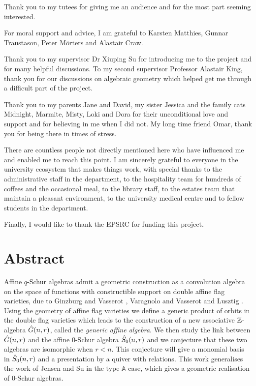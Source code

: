 \documentclass[a4paper, 11pt, twoside]{report}
\begin{document}
Thank you to my tutees for giving me an audience and for the most part seeming interested.

For moral support and advice, I am grateful to Karsten Matthies, Gunnar Traustason, Peter Mörters and Alastair Craw.

Thank you to my supervisor Dr Xiuping Su for introducing me to the project and for many helpful discussions. To my second supervisor Professor Alastair King, thank you for our discussions on algebraic geometry which helped get me through a difficult part of the project.  

Thank you to my parents Jane and David, my sister Jessica and the family cats Midnight, Marmite, Misty, Loki and Dora for their unconditional love and support and for believing in me when I did not. My long time friend Omar, thank you for being there in times of stress.

There are countless people not directly mentioned here who have influenced me and enabled me to reach this point. I am sincerely grateful to everyone in the university ecosystem that makes things work, with special thanks to the administrative staff in the department, to the hospitality team for hundreds of coffees and the occasional meal, to the library staff, to the estates team that maintain a pleasant environment, to the university medical centre and to fellow students in the department.

Finally, I would like to thank the EPSRC for funding this project.
\afterpage{\blankpage}

\chapter*{\centering Abstract}

Affine $q$-Schur algebras admit a geometric construction as a convolution algebra on the space of functions with constructible support on double affine flag varieties, due to Ginzburg and Vasserot \cite{ginzburg93}, Varagnolo and Vasserot \cite{varagnolo99} and Lusztig \cite{lusztig99}. Using the geometry of affine flag varieties we define a generic product of orbits in the double flag varieties which leads to the construction of a new associative $\mathbb{Z}$-algebra $\hat{G}(n,r)$, called the \emph{generic affine algebra}. We then study the link between $\hat{G}(n,r)$ and the affine $0$-Schur algebra $\hat{S}_0(n,r)$ and we conjecture that these two algebras are isomorphic when $r<n$. This conjecture will give a monomial basis in $\hat{S}_0(n,r)$ and a presentation by a quiver with relations. This work generalises the work of Jensen and Su \cite{su15} in the type $\mathbb{A}$ case, which gives a geometric realisation of $0$-Schur algebras.
\end{document}
